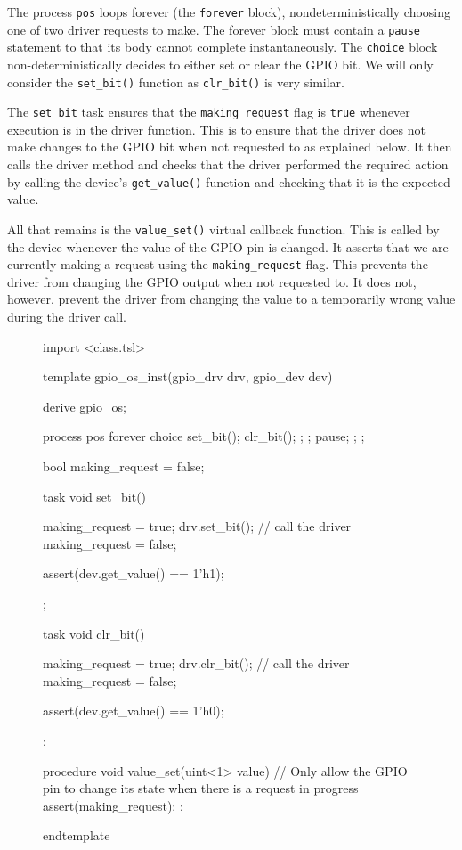 \documentclass{article}
\newcommand{\code}[1]{\texttt{#1}}
\begin{document}
The process \code{pos} loops forever (the \code{forever} block), nondeterministically choosing one of two driver requests to make. The forever block must contain a \code{pause} statement to that its body cannot complete instantaneously. The \code{choice} block non-deterministically decides to either set or clear the GPIO bit. We will only consider the \code{set\_bit()} function as \code{clr\_bit()} is very similar. 

The \code{set\_bit} task ensures that the \code{making\_request} flag is \code{true} whenever execution is in the driver function. This is to ensure that the driver does not make changes to the GPIO bit when not requested to as explained below. It then calls the driver method and checks that the driver performed the required action by calling the device's \code{get\_value()} function and checking that it is the expected value.

All that remains is the \code{value\_set()} virtual callback function. This is called by the device whenever the value of the GPIO pin is changed. It asserts that we are currently making a request using the \code{making\_request} flag. This prevents the driver from changing the GPIO output when not requested to. It does not, however, prevent the driver from changing the value to a temporarily wrong value during the driver call. 

\begin{figure}[H]
\lstset{numbers=left}
\begin{tsllisting}
import <class.tsl>

template gpio_os_inst(gpio_drv drv, gpio_dev dev)

derive gpio_os;

process pos {
    forever{
        choice{       
            set_bit();
            clr_bit();
            {};      
        };
        pause;      
    };
};

bool making_request = false;

task void set_bit(){
    making_request = true;
    drv.set_bit(); // call the driver
    making_request = false;

    assert(dev.get_value() == 1'h1);
};

task void clr_bit(){
    making_request = true;
    drv.clr_bit(); // call the driver
    making_request = false;

    assert(dev.get_value() == 1'h0);
};

procedure void value_set(uint<1> value){
    // Only allow the GPIO pin to change its state when there is a request in progress
    assert(making_request);
};

endtemplate
\end{tsllisting}
\end{figure}
\end{document}
